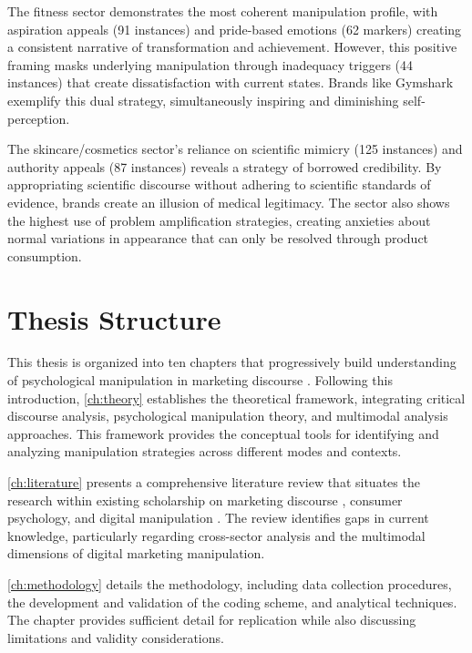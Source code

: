 The fitness sector demonstrates the most coherent manipulation profile, with aspiration appeals (91 instances) and pride-based emotions (62 markers) creating a consistent narrative of transformation and achievement. However, this positive framing masks underlying manipulation through inadequacy triggers (44 instances) that create dissatisfaction with current states. Brands like Gymshark exemplify this dual strategy, simultaneously inspiring and diminishing self-perception.

The skincare/cosmetics sector's reliance on scientific mimicry (125 instances) and authority appeals (87 instances) reveals a strategy of borrowed credibility. By appropriating scientific discourse without adhering to scientific standards of evidence, brands create an illusion of medical legitimacy. The sector also shows the highest use of problem amplification strategies, creating anxieties about normal variations in appearance that can only be resolved through product consumption.

\section{Thesis Structure}
\label{sec:thesis_structure}

This thesis is organized into ten chapters that progressively build understanding of psychological manipulation in marketing discourse \cite{fairclough2015language}. Following this introduction, \autoref{ch:theory} establishes the theoretical framework, integrating critical discourse analysis, psychological manipulation theory, and multimodal analysis approaches. This framework provides the conceptual tools for identifying and analyzing manipulation strategies across different modes and contexts.

\autoref{ch:literature} presents a comprehensive literature review that situates the research within existing scholarship on marketing discourse \cite{fairclough2015language}, consumer psychology, and digital manipulation \cite{calo2014digital}. The review identifies gaps in current knowledge, particularly regarding cross-sector analysis and the multimodal dimensions of digital marketing manipulation.

\autoref{ch:methodology} details the methodology, including data collection procedures, the development and validation of the coding scheme, and analytical techniques. The chapter provides sufficient detail for replication while also discussing limitations and validity considerations.

